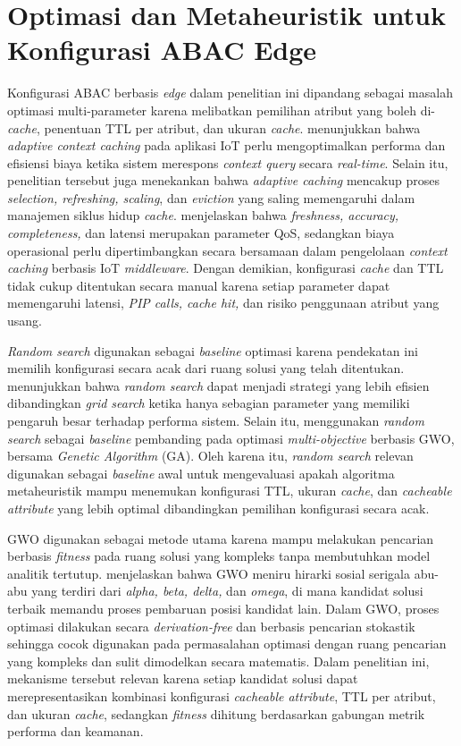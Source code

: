 \section{Optimasi dan Metaheuristik untuk Konfigurasi ABAC Edge}

Konfigurasi ABAC berbasis \textit{edge} dalam penelitian ini dipandang sebagai masalah optimasi multi-parameter karena melibatkan pemilihan atribut yang boleh di-\textit{cache}, penentuan TTL per atribut, dan ukuran \textit{cache}. \textcite{weerasinghe_adaptive_2023} menunjukkan bahwa \textit{adaptive context caching} pada aplikasi IoT perlu mengoptimalkan performa dan efisiensi biaya ketika sistem merespons \textit{context query} secara \textit{real-time}. Selain itu, penelitian tersebut juga menekankan bahwa \textit{adaptive caching} mencakup proses \textit{selection, refreshing, scaling}, dan \textit{eviction} yang saling memengaruhi dalam manajemen siklus hidup \textit{cache}. \textcite{medvedev_refresh_2023} menjelaskan bahwa \textit{freshness, accuracy, completeness,} dan latensi merupakan parameter QoS, sedangkan biaya operasional perlu dipertimbangkan secara bersamaan dalam pengelolaan \textit{context caching} berbasis IoT \textit{middleware}. Dengan demikian, konfigurasi \textit{cache} dan TTL tidak cukup ditentukan secara manual karena setiap parameter dapat memengaruhi latensi, \textit{PIP calls, cache hit,} dan risiko penggunaan atribut yang usang.

\textit{Random search} digunakan sebagai \textit{baseline} optimasi karena pendekatan ini memilih konfigurasi secara acak dari ruang solusi yang telah ditentukan. \textcite{bergstra_random_2012} menunjukkan bahwa \textit{random search} dapat menjadi strategi yang lebih efisien dibandingkan \textit{grid search} ketika hanya sebagian parameter yang memiliki pengaruh besar terhadap performa sistem. Selain itu, \textcite{feng_dynamic_2025} menggunakan \textit{random search} sebagai \textit{baseline} pembanding pada optimasi \textit{multi-objective} berbasis GWO, bersama \textit{Genetic Algorithm} (GA). Oleh karena itu, \textit{random search} relevan digunakan sebagai \textit{baseline} awal untuk mengevaluasi apakah algoritma metaheuristik mampu menemukan konfigurasi TTL, ukuran \textit{cache}, dan \textit{cacheable attribute} yang lebih optimal dibandingkan pemilihan konfigurasi secara acak.

GWO digunakan sebagai metode utama karena mampu melakukan pencarian berbasis \textit{fitness} pada ruang solusi yang kompleks tanpa membutuhkan model analitik tertutup. \textcite{mirjalili_grey_2014} menjelaskan bahwa GWO meniru hirarki sosial serigala abu-abu yang terdiri dari \textit{alpha, beta, delta,} dan \textit{omega}, di mana kandidat solusi terbaik memandu proses pembaruan posisi kandidat lain. Dalam GWO, proses optimasi dilakukan secara \textit{derivation-free} dan berbasis pencarian stokastik sehingga cocok digunakan pada permasalahan optimasi dengan ruang pencarian yang kompleks dan sulit dimodelkan secara matematis. Dalam penelitian ini, mekanisme tersebut relevan karena setiap kandidat solusi dapat merepresentasikan kombinasi konfigurasi \textit{cacheable attribute}, TTL per atribut, dan ukuran \textit{cache}, sedangkan \textit{fitness} dihitung berdasarkan gabungan metrik performa dan keamanan.

